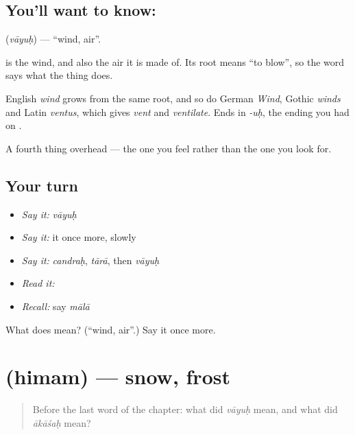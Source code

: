 \subsection*{You'll want to know: }
\textbf{} (\emph{vāyuḥ}) — \textquotedblleft{}wind, air\textquotedblright{}.

\textbf{} is the wind, and also the air it is made of. Its root means \textquotedblleft{}to blow\textquotedblright{}, so the word says what the thing does.

English \emph{wind} grows from the same root, and so do German \emph{Wind}, Gothic \emph{winds} and Latin \emph{ventus}, which gives \emph{vent} and \emph{ventilate}. Ends in \emph{-uḥ}, the ending you had on \textbf{}.

\begin{grammarlens}[title={What you've built}]
A fourth thing overhead — the one you feel rather than the one you look for.
\end{grammarlens}

\subsection*{Your turn}
\begin{itemize}
\raggedright
  \item \emph{Say it:} \emph{vāyuḥ}
  \item \emph{Say it:} it once more, slowly
  \item \emph{Say it:} \emph{candraḥ}, \emph{tārā}, then \emph{vāyuḥ}
  \item \emph{Read it:} \textbf{}
  \item \emph{Recall:} say \emph{mālā}
\end{itemize}

\begin{tcolorbox}[breakable,colback=teal!4,colframe=teal!35!black,title={Before you move on}]
What does  mean? (\textquotedblleft{}wind, air\textquotedblright{}.) Say it once more.
\end{tcolorbox}
\section[\texorpdfstring{\sk{हिमम्} (himam)}{हिमम् (himam)}]{ (himam) — snow, frost}

\label{lesson:SA-C31-snow}



\begin{quote}
Before the last word of the chapter: what did \emph{vāyuḥ} mean, and what did \emph{ākāśaḥ} mean?
\end{quote}

